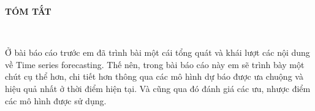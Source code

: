 \newpage
\changefontsizes{16pt}
\centerline{\textbf{TÓM TẮT}}\

\changefontsizes{13pt}
\setlength{\parindent}{0em}
Ở bài báo cáo trước em đã trình bài một cái tổng quát và khái lượt các nội dung về Time series forecasting. Thế nên, trong bài báo cáo này em sẽ trình bày một chút cụ thể hơn, chi tiết hơn thông qua các mô hình dự báo được ưa chuộng và hiệu quả nhất ở thời điểm hiện tại. Và cũng qua đó đánh giá các ưu, nhược điểm các mô hình được sử dụng.